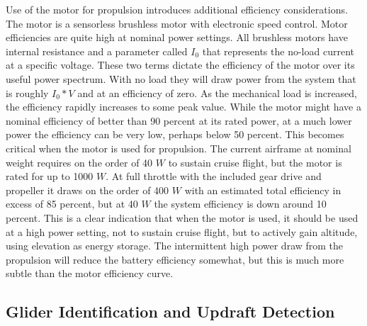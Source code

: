 \documentclass{ifacconf}
\begin{document}
Use of the motor for propulsion introduces additional efficiency considerations. The motor is a sensorless brushless motor with electronic speed control. Motor efficiencies are quite high at nominal power settings. All brushless motors have internal resistance and a parameter called $I_0$ that represents the no-load current at a specific voltage. These two terms dictate the efficiency of the motor over its useful power spectrum. With no load they will draw power from the system that is roughly $I_0*V$ and at an efficiency of zero. As the mechanical load is increased, the efficiency rapidly increases to some peak value. While the motor might have a nominal efficiency of better than 90 percent at its rated power, at a much lower power the efficiency can be very low, perhaps below 50 percent. This becomes critical when the motor is used for propulsion. The current airframe at nominal weight requires on the order of 40 $W$ to sustain cruise flight, but the motor is rated for up to 1000 $W$. At full throttle with the included gear drive and propeller it draws on the order of 400 $W$ with an estimated total efficiency in excess of 85 percent, but at 40 $W$ the system efficiency is down around 10 percent. This is a clear indication that when the motor is used, it should be used at a high power setting, not to sustain cruise flight, but to actively gain altitude, using elevation as energy storage. The intermittent high power draw from the propulsion will reduce the battery efficiency somewhat, but this is much more subtle than the motor efficiency curve.

\subsection{Glider Identification and Updraft Detection}
\label{subsec:SysID}
\end{document}

